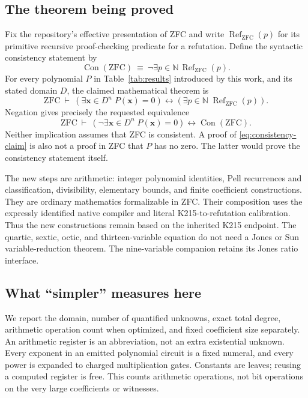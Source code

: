 \documentclass[11pt,a4paper]{article}
\numberwithin{equation}{section}
\newcommand{\ZFC}{\mathrm{ZFC}}
\newcommand{\Con}{\operatorname{Con}}
\newcommand{\N}{\mathbb N}
\begin{document}
\subsection{The theorem being proved}

Fix the repository's effective presentation of ZFC and write
$\operatorname{Ref}_{\ZFC}(p)$ for its primitive recursive proof-checking
predicate for a refutation. Define the syntactic consistency statement by
\[
 \Con(\ZFC)\ \equiv\ \neg\exists p\in\N\,
                                \operatorname{Ref}_{\ZFC}(p).
\]
For every polynomial $P$ in Table~\ref{tab:results} introduced by this
work, and its stated domain $D$, the claimed mathematical theorem is
\begin{equation}
 \ZFC\ \vdash\
 \left(\exists\boldsymbol{x}\in D^n\;P(\boldsymbol{x})=0\right)
 \longleftrightarrow
 \left(\exists p\in\N\;\operatorname{Ref}_{\ZFC}(p)\right).
 \label{eq:logical-claim}
\end{equation}
Negation gives precisely the requested equivalence
\begin{equation}
 \ZFC\ \vdash\
 \left(\neg\exists\boldsymbol{x}\in D^n\;P(\boldsymbol{x})=0\right)
 \longleftrightarrow\Con(\ZFC).
 \label{eq:consistency-claim}
\end{equation}
Neither implication assumes that ZFC is consistent. A proof of
\eqref{eq:consistency-claim} is also not a proof in ZFC that $P$ has no
zero. The latter would prove the consistency statement itself.

The new steps are arithmetic: integer polynomial identities, Pell
recurrences and classification, divisibility, elementary bounds, and
finite coefficient constructions. They are ordinary mathematics
formalizable in ZFC. Their composition uses the expressly identified
native compiler and literal K215-to-refutation calibration. Thus the new
constructions remain based on the inherited K215 endpoint. The quartic,
sextic, octic, and thirteen-variable equation do not need a Jones or Sun
variable-reduction theorem. The nine-variable companion retains its
Jones ratio interface.

\subsection{What ``simpler'' measures here}

We report the domain, number of quantified unknowns, exact total degree,
arithmetic operation count when optimized, and fixed coefficient size
separately. An arithmetic register is an abbreviation, not an extra
existential unknown. Every exponent in an emitted polynomial circuit is
a fixed numeral, and every power is expanded to charged multiplication
gates. Constants are leaves; reusing a computed register is free. This
counts arithmetic operations, not bit operations on the very large
coefficients or witnesses.
\end{document}
